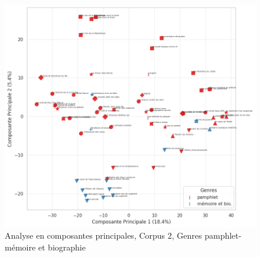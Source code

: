 \begin{figure}[H]
\centering %
\includegraphics[width=1\textwidth]{img/ACP-corpus-2-PamMem.png}
\caption{Analyse en composantes principales, Corpus 2, Genres pamphlet-mémoire et biographie}
\label{'fig:ACP-corpus-2-PamMem'}
\end{figure}


